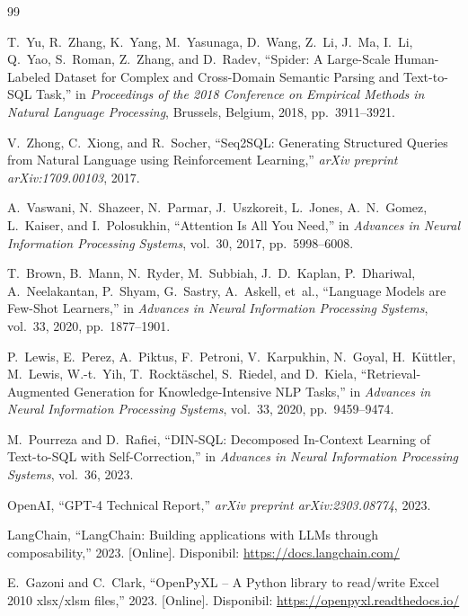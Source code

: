 \documentclass[12pt, a4paper]{report}
\begin{document}
\begin{thebibliography}{99}

T.~Yu, R.~Zhang, K.~Yang, M.~Yasunaga, D.~Wang, Z.~Li, J.~Ma, I.~Li, Q.~Yao, S.~Roman, Z.~Zhang, and D.~Radev, ``Spider: A Large-Scale Human-Labeled Dataset for Complex and Cross-Domain Semantic Parsing and Text-to-SQL Task,'' in \textit{Proceedings of the 2018 Conference on Empirical Methods in Natural Language Processing}, Brussels, Belgium, 2018, pp.~3911--3921.

V.~Zhong, C.~Xiong, and R.~Socher, ``Seq2SQL: Generating Structured Queries from Natural Language using Reinforcement Learning,'' \textit{arXiv preprint arXiv:1709.00103}, 2017.

A.~Vaswani, N.~Shazeer, N.~Parmar, J.~Uszkoreit, L.~Jones, A.~N.~Gomez, L.~Kaiser, and I.~Polosukhin, ``Attention Is All You Need,'' in \textit{Advances in Neural Information Processing Systems}, vol.~30, 2017, pp.~5998--6008.

T.~Brown, B.~Mann, N.~Ryder, M.~Subbiah, J.~D.~Kaplan, P.~Dhariwal, A.~Neelakantan, P.~Shyam, G.~Sastry, A.~Askell, et~al., ``Language Models are Few-Shot Learners,'' in \textit{Advances in Neural Information Processing Systems}, vol.~33, 2020, pp.~1877--1901.

P.~Lewis, E.~Perez, A.~Piktus, F.~Petroni, V.~Karpukhin, N.~Goyal, H.~K\"{u}ttler, M.~Lewis, W.-t.~Yih, T.~Rockt\"{a}schel, S.~Riedel, and D.~Kiela, ``Retrieval-Augmented Generation for Knowledge-Intensive NLP Tasks,'' in \textit{Advances in Neural Information Processing Systems}, vol.~33, 2020, pp.~9459--9474.

M.~Pourreza and D.~Rafiei, ``DIN-SQL: Decomposed In-Context Learning of Text-to-SQL with Self-Correction,'' in \textit{Advances in Neural Information Processing Systems}, vol.~36, 2023.

OpenAI, ``GPT-4 Technical Report,'' \textit{arXiv preprint arXiv:2303.08774}, 2023.

LangChain, ``LangChain: Building applications with LLMs through composability,'' 2023. [Online]. Disponibil: \url{https://docs.langchain.com/}

E.~Gazoni and C.~Clark, ``OpenPyXL -- A Python library to read/write Excel 2010 xlsx/xlsm files,'' 2023. [Online]. Disponibil: \url{https://openpyxl.readthedocs.io/}


\end{thebibliography}
\end{document}
